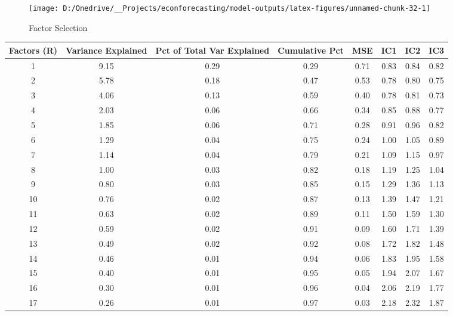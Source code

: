 \documentclass[11pt, letterpaper]{article}\usepackage[]{graphicx}\usepackage[]{color}
\begin{document}
\begin{figure}[H]

{\centering \texttt{[image: D:/Onedrive/\_\_Projects/econforecasting/model-outputs/latex-figures/unnamed-chunk-32-1]} 

}

\caption[Factor Selection]{Factor Selection}\label{fig:unnamed-chunk-32}
\end{figure}



\begin{table}[H]
\centering
\begingroup\scriptsize
\begin{tabular}{cccccccc}
  \hline
Factors (R) & Variance Explained & Pct of Total Var Explained & Cumulative Pct & MSE & IC1 & IC2 & IC3 \\ 
  \hline
  1 & 9.15 & 0.29 & 0.29 & 0.71 & 0.83 & 0.84 & 0.82 \\ 
    2 & 5.78 & 0.18 & 0.47 & 0.53 & 0.78 & 0.80 & 0.75 \\ 
    3 & 4.06 & 0.13 & 0.59 & 0.40 & 0.78 & 0.81 & 0.73 \\ 
    4 & 2.03 & 0.06 & 0.66 & 0.34 & 0.85 & 0.88 & 0.77 \\ 
    5 & 1.85 & 0.06 & 0.71 & 0.28 & 0.91 & 0.96 & 0.82 \\ 
    6 & 1.29 & 0.04 & 0.75 & 0.24 & 1.00 & 1.05 & 0.89 \\ 
    7 & 1.14 & 0.04 & 0.79 & 0.21 & 1.09 & 1.15 & 0.97 \\ 
    8 & 1.00 & 0.03 & 0.82 & 0.18 & 1.19 & 1.25 & 1.04 \\ 
    9 & 0.80 & 0.03 & 0.85 & 0.15 & 1.29 & 1.36 & 1.13 \\ 
   10 & 0.76 & 0.02 & 0.87 & 0.13 & 1.39 & 1.47 & 1.21 \\ 
   11 & 0.63 & 0.02 & 0.89 & 0.11 & 1.50 & 1.59 & 1.30 \\ 
   12 & 0.59 & 0.02 & 0.91 & 0.09 & 1.60 & 1.71 & 1.39 \\ 
   13 & 0.49 & 0.02 & 0.92 & 0.08 & 1.72 & 1.82 & 1.48 \\ 
   14 & 0.46 & 0.01 & 0.94 & 0.06 & 1.83 & 1.95 & 1.58 \\ 
   15 & 0.40 & 0.01 & 0.95 & 0.05 & 1.94 & 2.07 & 1.67 \\ 
   16 & 0.30 & 0.01 & 0.96 & 0.04 & 2.06 & 2.19 & 1.77 \\ 
   17 & 0.26 & 0.01 & 0.97 & 0.03 & 2.18 & 2.32 & 1.87 \\ 

\end{tabular}
\end{table}
\end{document}
